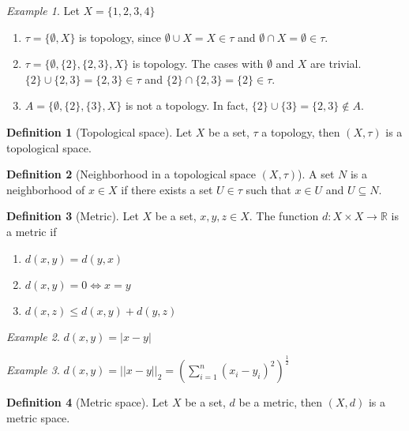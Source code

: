 \documentclass{article}
\newcommand{\DS}{\displaystyle}
\newcommand{\abs}[1]{\left|#1\right|}
\newcommand{\ar}{\rightarrow}
\newenvironment{enumrom}{\begin{enumerate}[label=(\roman*)]}{\end{enumerate}}
\theoremstyle{definition}
\newtheorem{definition}{Definition}[section]
\theoremstyle{definition}
\theoremstyle{plain}
\theoremstyle{plain}
\theoremstyle{plain}
\theoremstyle{plain}
\theoremstyle{definition}
\theoremstyle{remark}
\newtheorem{exampled}{Example}[definition]
\theoremstyle{remark}
\theoremstyle{remark}
\theoremstyle{remark}
\newcommand{\R}{\mathbb{R}}
\begin{document}
\begin{exampled}
  Let $X = \{ 1, 2, 3, 4 \}$
  \begin{enumerate}
  \item $\tau = \{ \emptyset, X \}$ is topology, since $\emptyset \cup X = X \in \tau$ and $\emptyset \cap X = \emptyset \in \tau$.
  \item $\tau = \{ \emptyset, \{ 2 \}, \{ 2, 3 \}, X \}$ is topology. The cases with $\emptyset$ and $X$ are trivial. $\{ 2 \} \cup \{ 2, 3 \} = \{ 2, 3 \} \in \tau$ and $\{ 2 \} \cap \{ 2, 3 \} = \{ 2 \} \in \tau$.
  \item $A = \{ \emptyset, \{ 2 \}, \{ 3 \}, X \}$ is not a topology. In fact, $\{ 2 \} \cup \{ 3 \} = \{ 2, 3 \} \notin A$.
  \end{enumerate}
\end{exampled}


\begin{definition}[Topological space]
  Let $X$ be a set, $\tau$ a topology, then $(X, \tau)$ is a topological space.
\end{definition}


\begin{definition}[Neighborhood in a topological space $(X, \tau)$]
  A set $N$ is a neighborhood of $x \in X$ if there exists a set $U \in \tau$ such that $x \in U$ and $U \subseteq N$.
\end{definition}


\begin{definition}[Metric]
  Let $X$ be a set, $x, y, z \in X$. The function $d : X \times X \ar \R$ is a metric if
  \begin{enumrom}
  \item $d(x,y) = d(y,x)$
  \item $d(x,y) = 0 \iff x = y$
  \item $d(x,z) \leq d(x,y) + d(y,z)$
  \end{enumrom}
\end{definition}

\begin{exampled}
  $d(x,y) = \abs{x - y}$
\end{exampled}

\begin{exampled}
  $\DS d(x,y) = ||x - y||_2 = \left(\sum_{i = 1}^n (x_i - y_i)^2\right)^{\frac{1}{2}}$
\end{exampled}


\begin{definition}[Metric space]
  Let $X$ be a set, $d$ be a metric, then $(X, d)$ is a metric space.
\end{definition}
\end{document}

